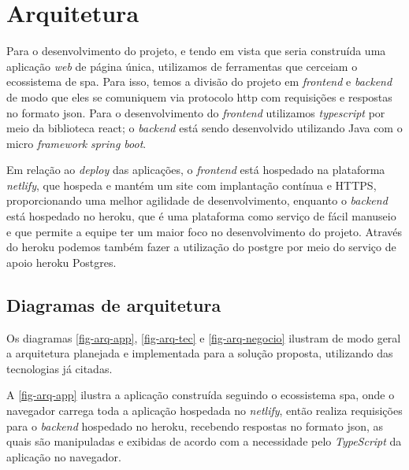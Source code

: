 \section{Arquitetura}
Para o desenvolvimento do projeto, e tendo em vista que seria construída uma aplicação \textit{web} de página única, utilizamos de ferramentas que cerceiam o ecossistema de \ac{spa}. Para isso, temos a divisão do projeto em \textit{\gls{frontend}} e \textit{\gls{backend}} de modo que eles se comuniquem via protocolo \ac{http} com requisições e respostas no formato \ac{json}. Para o desenvolvimento do \textit{\gls{frontend}} utilizamos \textit{\gls{typescript}} por meio da biblioteca \gls{react}; o \textit{\gls{backend}} está sendo desenvolvido utilizando Java com o micro \textit{\gls{framework}} \textit{\gls{spring boot}}.

Em relação ao \textit{\gls{deploy}} das aplicações, o \textit{\gls{frontend}} está hospedado na plataforma \textit{\gls{netlify}}, que hospeda e mantém um site com implantação contínua e HTTPS, proporcionando uma melhor agilidade de desenvolvimento, enquanto o \textit{\gls{backend}} está hospedado no \gls{heroku}, que é uma plataforma como serviço de fácil manuseio e que permite a equipe ter um maior foco no desenvolvimento do projeto. Através do \gls{heroku} podemos também fazer a utilização do \gls{postgre} por meio do serviço de apoio \gls{heroku} Postgres.

\subsection{Diagramas de arquitetura}
Os diagramas \autoref{fig-arq-app}, \autoref{fig-arq-tec} e \autoref{fig-arq-negocio} ilustram de modo geral a arquitetura planejada e implementada para a solução proposta, utilizando das tecnologias já citadas.

A \autoref{fig-arq-app} ilustra a aplicação construída seguindo o ecossistema \ac{spa}, onde o navegador carrega toda a aplicação hospedada no \textit{\gls{netlify}}, então realiza requisições para o \textit{\gls{backend}} hospedado no \gls{heroku}, recebendo respostas no formato \ac{json}, as quais são manipuladas e exibidas de acordo com a necessidade pelo \textit{TypeScript} da aplicação no navegador.

